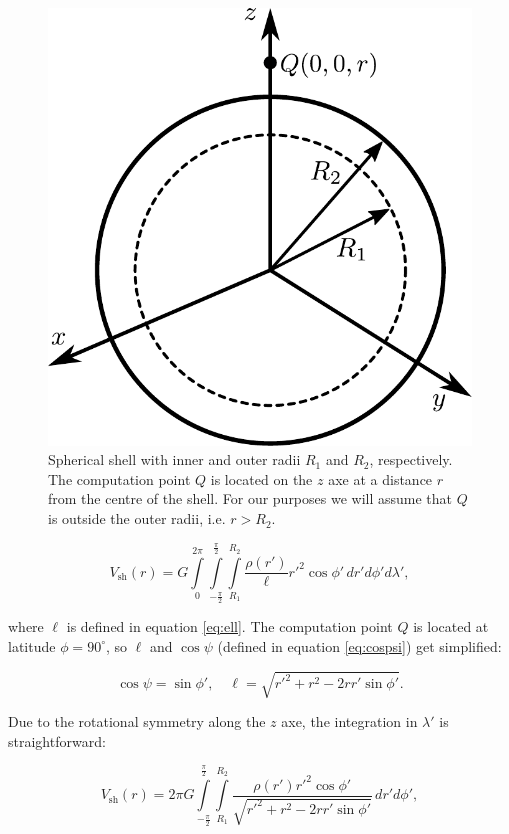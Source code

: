 \documentclass[extra]{gji}
\begin{document}
\begin{figure}
\centering
\includegraphics[width=0.7\linewidth]{figures/spherical-shell.pdf}
\caption{
    Spherical shell with inner and outer radii $R_1$ and $R_2$, respectively.
    The computation point $Q$ is located on the $z$ axe at a distance $r$ from
    the centre of the shell.
    For our purposes we will assume that $Q$ is outside the outer radii,
    i.e. $r > R_2$.
    }
\label{fig:spherical-shell}
\end{figure}

\begin{equation}
    V_\text{sh}(r) = G 
    \int\limits_0^{2\pi}
    \int\limits_{-\frac{\pi}{2}}^\frac{\pi}{2}
    \int\limits_{R_1}^{R_2}
    \frac{\rho(r')}{\ell} {r'}^2 \cos\phi' \, 
    dr' d\phi' d\lambda',
\end{equation}

\noindent where $\ell$ is defined in equation \ref{eq:ell}.
The computation point $Q$ is located at latitude $\phi=90^\circ$, so 
$\ell$ and $\cos\psi$ (defined in equation \ref{eq:cospsi}) get 
simplified:

\begin{equation}
    \cos\psi = \sin\phi', \quad
    \ell = \sqrt{r'^2 + r^2 - 2 r r' \sin\phi'}.
\end{equation}

Due to the rotational symmetry along the $z$ axe, the integration in 
$\lambda'$ is straightforward:

\begin{equation}
    V_\text{sh}(r) = 2\pi G 
    \int\limits_{-\frac{\pi}{2}}^\frac{\pi}{2}
    \int\limits_{R_1}^{R_2}
    \frac{\rho(r') {r'}^2 \cos\phi'}{\sqrt{r'^2 + r^2 - 2 r r' \sin\phi'}}
    \, dr' d\phi',
\end{equation}
\end{document}
